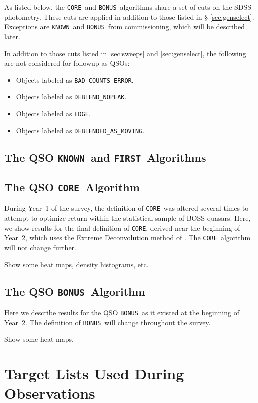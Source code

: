 \documentclass[12pt,preprint]{aastex}
\newcommand{\core}{\texttt{CORE}}
\newcommand{\bonus}{\texttt{BONUS}}
\newcommand{\known}{\texttt{KNOWN}}
\newcommand{\first}{\texttt{FIRST}}
\begin{document}
As listed below, the \core\ and \bonus\ algorithms share a set of cuts on the
SDSS photometry. These cuts are applied in addition to those listed in \S
\ref{sec:genselect}. Exceptions are \known\ and \bonus\ from commissioning,
which will be described later.

In addition to those cuts listed in \ref{sec:sweeps} and \ref{sec:genselect},
the following are not considered for followup as QSOs:

\begin{itemize}

    \item Objects labeled as \texttt{BAD\_COUNTS\_ERROR}.
    \item Objects labeled as \texttt{DEBLEND\_NOPEAK}.
    \item Objects labeled as \texttt{EDGE}.
    \item Objects labeled as \texttt{DEBLENDED\_AS\_MOVING}.

\end{itemize}

\subsection{The QSO \known\ and \first\ Algorithms} \label{sec:knownfirst}

\subsection{The QSO \core\ Algorithm}

During Year~1 of the survey, the definition of \core\ was altered several times
to attempt to optimize return within the statistical sample of BOSS quasars.
Here, we show results for the final definition of \core, derived near the
beginning of Year~2, which uses the Extreme Deconvolution method of
\citet{BovyQSOPhotoz2011}.  The \core\ algorithm will not change further.

Show some heat maps, density histograms, etc.

\subsection{The QSO \bonus\ Algorithm}

Here we describe results for the QSO \bonus\ as it existed at the beginning
of Year~2.  The definition of \bonus\ will change throughout the survey.

Show some heat maps.


\section{Target Lists Used During Observations}
\end{document}
